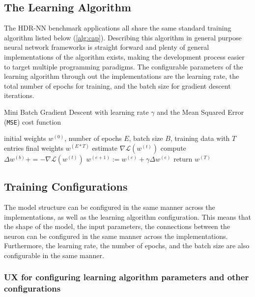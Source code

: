 \subsection{The Learning Algorithm}

The HDR-NN benchmark applications all share the same standard training algorithm listed below (\ref{alg:cap}). Describing this algorithm in general purpose neural network frameworks is straight forward and plenty of general implementations of the algorithm exists, making the development process easier to target multiple programming paradigms. The configurable parameters of the learning algorithm through out the implementations are the learning rate, the total number of epochs for training, and the batch size for gradient descent iterations.

\begin{algorithm}[h]
	\caption{Mini Batch Gradient Descent with learning rate $\gamma$ and the Mean Squared Error (\texttt{MSE}) cost function}
	\label{alg:cap}
	\begin{algorithmic}
	\Require initial weights $w^{(0)}$, number of epochs $E$, batch size $B$, training data with $T$ entries
	\Ensure final weights $w^{(E*T)}$
			\State estimate $\nabla \mathcal{L}(w^{(t)})$ 
			\State compute $\Delta w^{(b)} += - \nabla \mathcal{L}(w^{(t)})$\label{lin:deep-learning-delta-w}
			\EndFor
			\State $w^{(e + 1)} := w^{(e)} + \gamma \Delta w^{(e)}$
		\EndFor
	\EndFor
	\State return $w^{(T)}$
	\end{algorithmic}
\end{algorithm}

\subsection{Training Configurations}

The model structure can be configured in the same manner across the implementations, as well as the learning algorithm configuration. This means that the shape of the model, the input parameters, the connections between the neuron can be configured in the same manner across the implementations. Furthermore, the learning rate, the number of epochs, and the batch size are also configurable in the same manner.

\subsubsection{UX for configuring learning algorithm parameters and other configurations}

